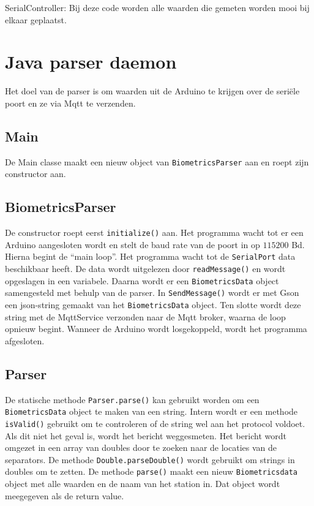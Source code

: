 \documentclass[a4paper]{report}
\newcommand{\code}[1]{\colorbox{light-gray}{\texttt{#1}}}
\begin{document}
            SerialController:
            Bij deze code worden alle waarden die gemeten worden mooi bij elkaar geplaatst.




            

        
    \section{Java parser daemon}
        Het doel van de parser is om waarden uit de Arduino te krijgen over de seri\"ele poort en ze via Mqtt te verzenden.

        \subsection{Main}
            De Main classe maakt een nieuw object van \code{BiometricsParser} aan en roept zijn constructor aan.

        \subsection{BiometricsParser}
            De constructor roept eerst \code{initialize()} aan.
            Het programma wacht tot er een Arduino aangesloten wordt en stelt de baud rate van de poort in op $115200$ Bd.
            Hierna begint de ``main loop''. Het programma wacht tot de \code{SerialPort} data beschikbaar heeft.
            De data wordt uitgelezen door \code{readMessage()} en wordt opgeslagen in een variabele.
            Daarna wordt er een \code{BiometricsData} object samengesteld met behulp van de parser.
            In \code{SendMessage()} wordt er met Gson een json-string gemaakt van het \code{BiometricsData} object.
            Ten slotte wordt deze string met de MqttService verzonden naar de Mqtt broker, waarna de loop opnieuw begint.
            Wanneer de Arduino wordt losgekoppeld, wordt het programma afgesloten.

        \subsection{Parser} 
            De statische methode \code{Parser.parse()} kan gebruikt worden om een \linebreak\code{BiometricsData} object te maken van een string.
            Intern wordt er een methode \code{isValid()} gebruikt om te controleren of de string wel aan het protocol voldoet.
            Als dit niet het geval is, wordt het bericht weggesmeten.
            Het bericht wordt omgezet in een array van doubles door te zoeken naar de locaties van de separators.
            De methode \code{Double.parseDouble()} wordt gebruikt om strings in doubles om te zetten.
            De methode \code{parse()} maakt een nieuw \code{Biometricsdata} object met alle waarden en de naam van het station in.
            Dat object wordt meegegeven als de return value.
\end{document}
